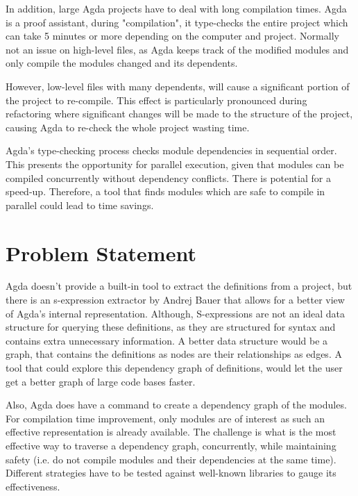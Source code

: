 In addition, large Agda projects have to deal with long compilation times. Agda
is a proof assistant, during "compilation", it type-checks the entire project
which can take 5 minutes or more depending on the computer and project.
Normally not an issue on high-level files, as Agda keeps track of the
modified modules and only compile the modules changed and its dependents.

However, low-level files with many dependents, will cause a significant portion
of the project to re-compile. This effect is particularly pronounced during
refactoring where significant changes will be made to the structure of the
project, causing Agda to re-check the whole project wasting time. 

Agda's type-checking process checks module dependencies in sequential order.
This presents the opportunity for parallel execution, given that modules can be
compiled concurrently without dependency conflicts. There is potential for a
speed-up. Therefore, a tool that finds modules which are safe to compile in
parallel could lead to time savings.

\section{Problem Statement}

Agda doesn't provide a built-in tool to extract the definitions from a project,
but there is an s-expression extractor by Andrej Bauer \cite{andrej} that
allows for a better view of Agda's internal representation. Although,
S-expressions are not an ideal data structure for querying these definitions,
as they are structured for syntax and contains extra unnecessary information.
A better data structure would be a graph, that contains the definitions as
nodes are their relationships as edges. A tool that could explore this
dependency graph of definitions, would let the user get a better graph of large
code bases faster.

Also, Agda does have a command to create a dependency graph of the modules. For
compilation time improvement, only modules are of interest as such an effective
representation is already available. The challenge is what is the most
effective way to traverse a dependency graph, concurrently, while maintaining
safety (i.e. do not compile modules and their dependencies at the same time).
Different strategies have to be tested against well-known libraries to gauge
its effectiveness. 

